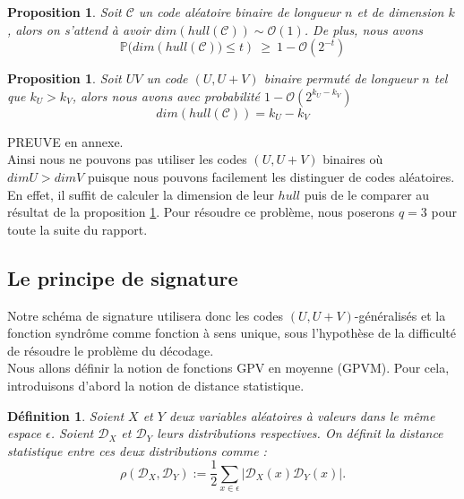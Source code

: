 \documentclass[12pt]{article}
\theoremstyle{plain}
\newtheorem{defi}[thm]{Définition}
\newtheorem{propo}[thm]{Proposition}
\begin{document}
\begin{propo}\label{dim_hull}
Soit $\mathcal{C}$ un code aléatoire binaire de longueur $n$ et de dimension $k$, alors on s'attend à avoir $dim(hull(\mathcal{C}))\sim\mathcal{O}(1)$. De plus, nous avons $$ \mathbb{P}\big(dim(hull(\mathcal{C})\big) \leq t) \ \geq\ 1 - \mathcal{O}(2^{-t}) $$
\end{propo}

\begin{propo}\label{dim_hull_UV}
Soit $UV$ un code $(U,U+V)$ binaire permuté de longueur $n$ tel que $k_U > k_V$, alors nous avons avec probabilité $1-\mathcal{O}(2^{k_U-k_V})$
$$ dim(hull(\mathcal{C})) = k_U - k_V $$
\end{propo}
PREUVE en annexe.\\

Ainsi nous ne pouvons pas utiliser les codes $(U,U+V)$ binaires où $dim U > dim V$ puisque nous pouvons facilement les distinguer de codes aléatoires.
En effet, il suffit de calculer la dimension de  leur $hull$ puis de le comparer au résultat de la proposition \ref{dim_hull}.
Pour résoudre ce problème, nous poserons $q=3$ pour toute la suite du rapport.




\subsection{Le principe de signature}

Notre schéma de signature utilisera donc les codes $(U,U+V)$-généralisés et la fonction syndrôme comme fonction à sens unique, sous l'hypothèse de la difficulté de résoudre le problème du décodage. \\

Nous allons définir la notion de fonctions GPV en moyenne (GPVM). Pour cela, introduisons d'abord la notion de distance statistique.

\begin{defi}
Soient $X$ et $Y$ deux variables aléatoires à valeurs dans le même espace $\epsilon$. 
Soient $\mathcal{D}_X$ et $\mathcal{D}_Y$ leurs distributions respectives. On définit la distance statistique entre ces deux distributions comme :
$$ \rho(\mathcal{D}_X,\mathcal{D}_Y) := \frac{1}{2} \sum_{x \in \epsilon} |\mathcal{D}_X(x) \mathcal{D}_Y(x)|.$$
\end{defi}
\end{document}
